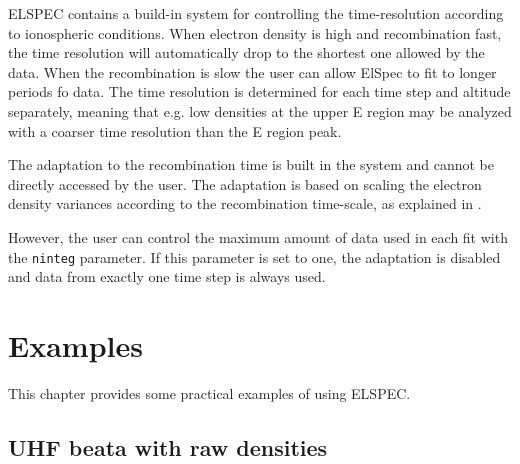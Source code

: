 \documentclass[12pt,a4paper]{report}
\begin{document}
ELSPEC contains a build-in system for controlling the time-resolution according to ionospheric conditions. When electron density is high and recombination fast, the time resolution will automatically drop to the shortest one allowed by the data. When the recombination is slow the user can allow ElSpec to fit to longer periods fo data. The time resolution is determined for each time step and altitude separately, meaning that e.g. low densities at the upper E region may be analyzed with a coarser time resolution than the E region peak. 

The adaptation to the recombination time is built in the system and cannot be directly accessed by the user. The adaptation is based on scaling the electron density variances according to the recombination time-scale, as explained in \cite{virtanen2018}. 

However, the user can control the maximum amount of data used in each fit with the \verb|ninteg| parameter. If this parameter is set to one, the adaptation is disabled and data from exactly one time step is always used. 


\chapter{Examples}

This chapter provides some practical examples of using ELSPEC. 

\section{UHF beata with raw densities}
\end{document}
